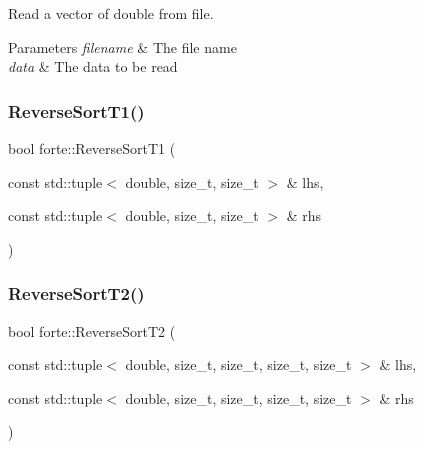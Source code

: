 Read a vector of double from file. 


\begin{DoxyParams}{Parameters}
{\em filename} & The file name \\
\hline
{\em data} & The data to be read \\
\hline
\end{DoxyParams}
\mbox{\label{namespaceforte_adf1d0a57ab74731847ff75621b8de820}} 
\subsubsection{\texorpdfstring{Reverse\+Sort\+T1()}{ReverseSortT1()}}
{\footnotesize\ttfamily bool forte\+::\+Reverse\+Sort\+T1 (\begin{DoxyParamCaption}\item[{const std\+::tuple$<$ double, size\+\_\+t, size\+\_\+t $>$ \&}]{lhs,  }\item[{const std\+::tuple$<$ double, size\+\_\+t, size\+\_\+t $>$ \&}]{rhs }\end{DoxyParamCaption})\hspace{0.3cm}{\ttfamily [inline]}}

\mbox{\label{namespaceforte_a175bdf86ad788817de917e2433805781}} 
\subsubsection{\texorpdfstring{Reverse\+Sort\+T2()}{ReverseSortT2()}}
{\footnotesize\ttfamily bool forte\+::\+Reverse\+Sort\+T2 (\begin{DoxyParamCaption}\item[{const std\+::tuple$<$ double, size\+\_\+t, size\+\_\+t, size\+\_\+t, size\+\_\+t $>$ \&}]{lhs,  }\item[{const std\+::tuple$<$ double, size\+\_\+t, size\+\_\+t, size\+\_\+t, size\+\_\+t $>$ \&}]{rhs }\end{DoxyParamCaption})\hspace{0.3cm}{\ttfamily [inline]}}

\mbox{\label{namespaceforte_adb089a7fca4b9438c8567ac2aad19ff9}} 
